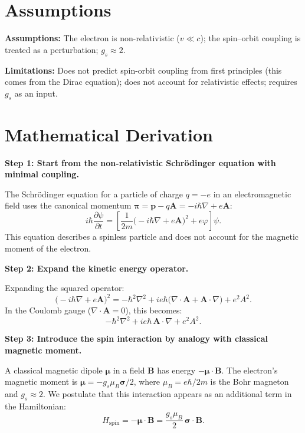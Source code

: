 \section*{Assumptions}

\textbf{Assumptions:} The electron is non-relativistic ($v \ll c$); the spin--orbit coupling is treated as a perturbation; $g_{s} \approx 2$.


\textbf{Limitations:} Does not predict spin-orbit coupling from first principles (this comes from the Dirac equation); does not account for relativistic effects; requires $g_{s}$ as an input.


\section*{Mathematical Derivation}

\textbf{Step 1: Start from the non-relativistic Schr\"odinger equation with minimal coupling.}

The Schr\"odinger equation for a particle of charge $q = -e$ in an electromagnetic field uses the canonical momentum $\boldsymbol{\pi} = \mathbf{p} - q\mathbf{A} = -i\hbar\nabla + e\mathbf{A}$:
\begin{equation}
i\hbar\frac{\partial\psi}{\partial t} = \left[\frac{1}{2m}\bigl(-i\hbar\nabla + e\mathbf{A}\bigr)^{2} + e\varphi\right]\psi.
\end{equation}
This equation describes a spinless particle and does not account for the magnetic moment of the electron.

\textbf{Step 2: Expand the kinetic energy operator.}

Expanding the squared operator:
\begin{equation}
\bigl(-i\hbar\nabla + e\mathbf{A}\bigr)^{2} = -\hbar^{2}\nabla^{2} + ie\hbar\bigl(\nabla\cdot\mathbf{A} + \mathbf{A}\cdot\nabla\bigr) + e^{2}A^{2}.
\end{equation}
In the Coulomb gauge ($\nabla\cdot\mathbf{A} = 0$), this becomes:
\begin{equation}
-\hbar^{2}\nabla^{2} + ie\hbar\,\mathbf{A}\cdot\nabla + e^{2}A^{2}.
\end{equation}

\textbf{Step 3: Introduce the spin interaction by analogy with classical magnetic moment.}

A classical magnetic dipole $\boldsymbol{\mu}$ in a field $\mathbf{B}$ has energy $-\boldsymbol{\mu}\cdot\mathbf{B}$. The electron's magnetic moment is $\boldsymbol{\mu} = -g_s \mu_B \boldsymbol{\sigma}/2$, where $\mu_B = e\hbar/2m$ is the Bohr magneton and $g_s \approx 2$. We postulate that this interaction appears as an additional term in the Hamiltonian:
\begin{equation}
H_{\text{spin}} = -\boldsymbol{\mu}\cdot\mathbf{B} = \frac{g_s \mu_B}{2}\,\boldsymbol{\sigma}\cdot\mathbf{B}.
\end{equation}

